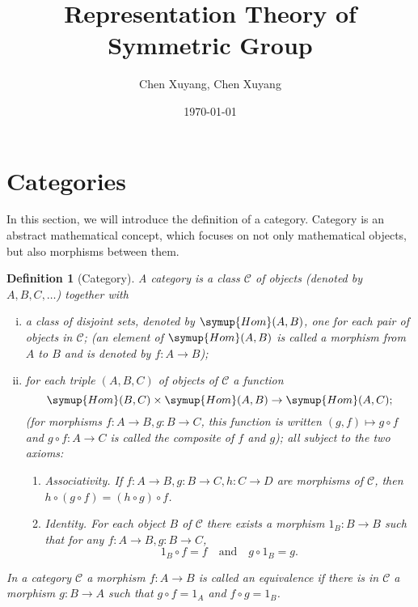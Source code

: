 \documentclass{assignment}[2019/10/15]
\title{Representation Theory of Symmetric Group}
\author{Chen Xuyang, Chen Xuyang}
\date{\today}
\institute{School of Mathematical Science}
\theoremstyle{plain}
\newtheorem{definition}[theorem]{Definition}
\newcommand{\SC}{\mathscr{C}}
\newcommand{\Hom}{\mathop{}\!\symup{Hom}}
\begin{document}
    \maketitle
    \tableofcontents
    \clearpage

    \section{Categories}

    In this section, we will introduce the definition of a category. Category is an abstract mathematical concept, which focuses on not only mathematical objects, but also morphisms between them.

    \begin{definition}[Category]
        A \emph{category} is a class $\mathscr{C}$ of objects (denoted by $A, B, C, \dotsc$) together with
        \begin{enumerate}[(i)]
            \item a class of disjoint sets, denoted by $\Hom(A, B)$, one for each pair of objects in $\mathscr{C}$; (an element of $\Hom(A, B)$ is called a \emph{morphism} from $A$ to $B$ and is denoted by $f\colon A\to B$);
            \item for each triple $(A, B, C)$ of objects of $\mathscr{C}$ a function
            \begin{equation}
                \Hom(B, C)\times \Hom(A, B)\to \Hom(A, C);
            \end{equation}
            (for morphisms $f\colon A\to B, g\colon B\to C$, this function is written $(g, f)\mapsto g\circ f$ and $g\circ f\colon A\to C$ is called the \emph{composite} of $f$ and $g$); all subject to the two axioms:
            \begin{enumerate}[\hspace{-1em}(I)]
                \item Associativity. If $f\colon A\to B, g\colon B\to C, h\colon C\to D$ are morphisms of $\SC$, then $h\circ (g\circ f) = (h\circ g)\circ f$.
                \item Identity. For each object $B$ of $\SC$ there exists a morphism $1_B\colon B\to B$ such that for any $f\colon A\to B, g\colon B\to C$,
                \begin{equation}
                    1_B \circ f = f\quad\text{and}\quad g\circ 1_B = g.
                \end{equation}
            \end{enumerate}
        \end{enumerate}

        In a category $\SC$ a morphism $f\colon A\to B$ is called an \emph{equivalence} if there is in $\SC$ a morphism $g\colon B\to A$ such that $g\circ f = 1_A$ and $f\circ g = 1_B$.
    \end{definition}
\end{document}
